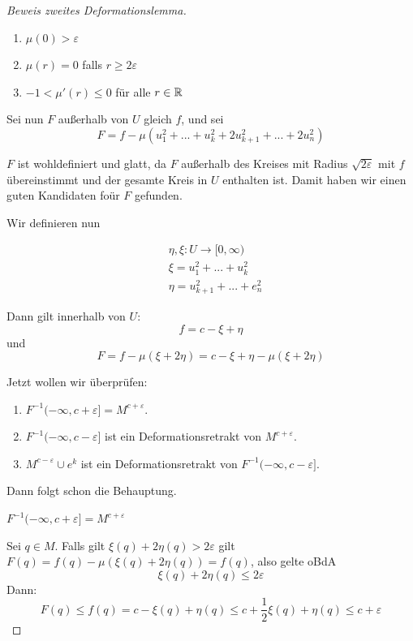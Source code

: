 \begin{proof}[Beweis zweites Deformationslemma]
    \begin{enumerate}
        \item $ \mu(0) > \varepsilon $
        \item $ \mu(r) = 0 $ falls $ r \geq 2 \varepsilon $
        \item $ -1 < \mu'(r) \leq 0 $ für alle $ r \in { \mathbb R } $
    \end{enumerate}

    Sei nun $F$ außerhalb von $U$ gleich $f$, und sei
    \[ F = f - \mu(u_1^2 + ... + u_k^2 + 2u_{k+1}^2 + ... + 2u_n^2) \]

    $F$ ist wohldefiniert und glatt, da $F$ außerhalb des Kreises mit Radius 
    $\sqrt{2\varepsilon}$ mit $f$ übereinstimmt und der gesamte Kreis in $U$ 
    enthalten ist. Damit haben wir einen guten Kandidaten foür $F$ gefunden.

    Wir definieren nun

    \begin{align*}
        & \eta, \xi: U \to [0, \infty) \\
        & \xi = u_1^2 + ... + u_k^2 \\
        & \eta = u_{k + 1}^2 + ... + e_n^2
    \end{align*}

    Dann gilt innerhalb von $U$:
    \[ f = c - \xi + \eta \]
    und 
    \[ F = f - \mu(\xi + 2 \eta) = c - \xi + \eta - \mu(\xi + 2 \eta) \]

    Jetzt wollen wir überprüfen:
    \begin{enumerate}
        \item $F^{-1}(-\infty, c + \varepsilon] = M^{c + \varepsilon}$.
        \item $F^{-1}(-\infty, c - \varepsilon]$ ist ein Deformationsretrakt von 
            $M^{c + \varepsilon}$.
        \item $M^{c - \varepsilon} \cup e^k$ ist ein Deformationsretrakt von
            $F^{-1}(-\infty, c - \varepsilon]$.
    \end{enumerate}

    Dann folgt schon die Behauptung.

     $F^{-1}(-\infty, c + \varepsilon] = M^{c + \varepsilon}$

    Sei $q \in M$. Falls gilt $\xi(q) + 2 \eta(q) > 2 \varepsilon$ gilt 
    $F(q) = f(q) - \mu(\xi(q) + 2\eta(q)) = f(q)$,
    also gelte oBdA 
    \[ \xi(q) + 2 \eta(q) \leq 2 \varepsilon \]
    Dann:
    \[ F(q) \leq f(q) = c - \xi(q) + \eta(q) \leq c + \frac{1}{2}\xi(q) + \eta(q) \leq c + \varepsilon \]
    \sectiondone


\end{proof}
